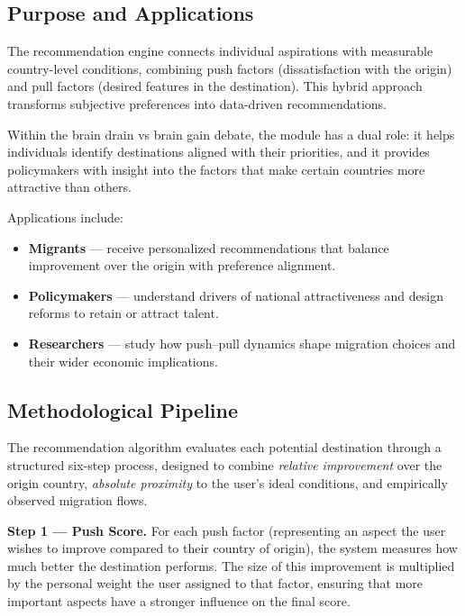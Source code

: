 \documentclass[11pt]{article}
\begin{document}
\subsection{Purpose and Applications}

The recommendation engine connects individual aspirations with measurable country-level conditions, combining push factors (dissatisfaction with the origin) and pull factors (desired features in the destination). This hybrid approach transforms subjective preferences into data-driven recommendations.  

\noindent
Within the brain drain vs brain gain debate, the module has a dual role: it helps individuals identify destinations aligned with their priorities, and it provides policymakers with insight into the factors that make certain countries more attractive than others.  

\noindent
Applications include:  
\begin{itemize}
    \item \textbf{Migrants} --- receive personalized recommendations that balance improvement over the origin with preference alignment.  
    \item \textbf{Policymakers} --- understand drivers of national attractiveness and design reforms to retain or attract talent.  
    \item \textbf{Researchers} --- study how push--pull dynamics shape migration choices and their wider economic implications.  
\end{itemize}


\subsection{Methodological Pipeline}

\noindent
The recommendation algorithm evaluates each potential destination through a structured six-step process, designed to combine \textit{relative improvement} over the origin country, \textit{absolute proximity} to the user’s ideal conditions, and empirically observed migration flows.

\medskip
\noindent
\textbf{Step 1 — Push Score.} For each push factor (representing an aspect the user wishes to improve compared to their country of origin), the system measures how much better the destination performs. The size of this improvement is multiplied by the personal weight the user assigned to that factor, ensuring that more important aspects have a stronger influence on the final score.
\end{document}
